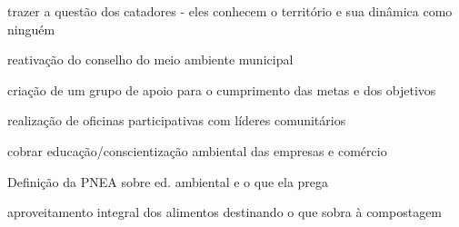 
trazer a questão dos catadores - eles conhecem o território e sua dinâmica como ninguém

reativação do conselho do meio ambiente municipal

criação de um grupo de apoio para o cumprimento das metas e dos objetivos



realização de oficinas participativas com líderes comunitários


cobrar educação/conscientização ambiental das empresas e comércio

Definição da PNEA sobre ed. ambiental e o que ela prega

aproveitamento integral dos alimentos destinando o que sobra à compostagem

